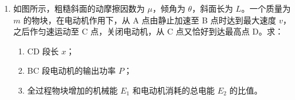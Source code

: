 \documentclass[\gkver]{gaokaozhenti}
\begin{document}
\begin{enumerate}
{$(m+M)v_{0} = Mv + mv_{1}$

解得 $v_{1} = \frac{(m + M)v_{0} - Mv}{m}$

方向与 $v_{0}$ 相同；

（2）以 B 为研究对象，对 B 列动量定理有

$F\Delta t = Mv - Mv_{0}$

解得 $F = \frac{M(v - v_{0})}{\Delta t}$
}

\item
如图所示，粗糙斜面的动摩擦因数为 $\mu$，倾角为 $\theta$，斜面长为 $L$。一个质量为 $m$ 的物块，在电动机作用下，从 A 点由静止加速至 B 点时达到最大速度 $v$，之后作匀速运动至 C 点，关闭电动机，从 C 点又恰好到达最高点 D。求：
\begin{enumerate}
	\item
	CD 段长 $x$；
	\item
	BC 段电动机的输出功率 $P$；
	\item
	全过程物块增加的机械能 $E_{1}$ 和电动机消耗的总电能 $E_{2}$ 的比值。
\end{enumerate}
\end{enumerate}
\end{document}
